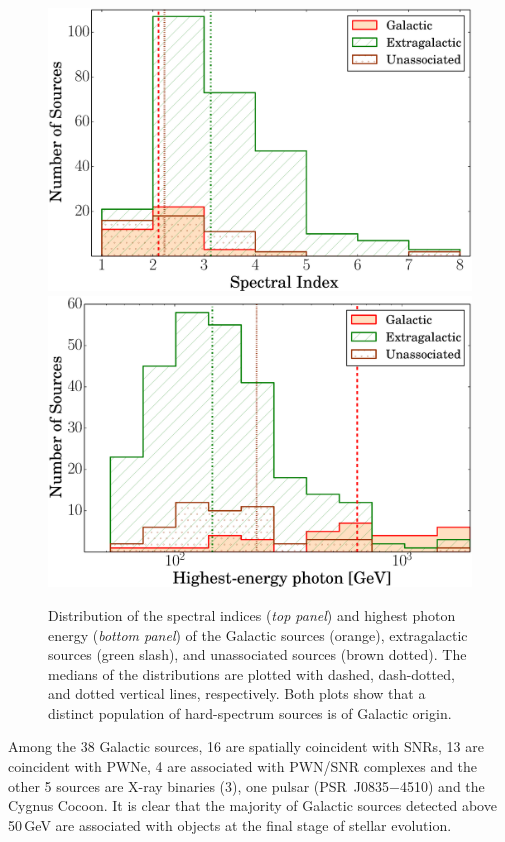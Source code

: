 {\begin{figure}[!ht]
    \begin{centering}
        \includegraphics[width=0.9\columnwidth]{Figures/hist_index-new.eps}
         \includegraphics[width=0.9\columnwidth]{Figures/hist_hep-new.eps} 
        \caption[Distribution of the spectral indices and highest photon energy]{Distribution of the spectral indices ({\it top panel}) and highest photon energy ({\it bottom panel}) of the Galactic sources (orange), extragalactic sources (green slash), and unassociated sources (brown dotted). The medians of the distributions are plotted with dashed, dash-dotted, and dotted vertical lines, respectively. Both plots show that a distinct population of hard-spectrum sources is of Galactic origin.
            \label{fig:hist_index}}
    \end{centering}
\end{figure}

Among the 38 Galactic sources, 16 are spatially coincident with SNRs, 13 are coincident with PWNe, 4 are associated with PWN/SNR complexes
and the other 5 sources are X-ray binaries (3), one pulsar (PSR~J0835$-$4510)
and the Cygnus Cocoon.
It is clear that the majority of Galactic sources detected above 50\,GeV
are associated with objects at the final stage of stellar evolution.

}
